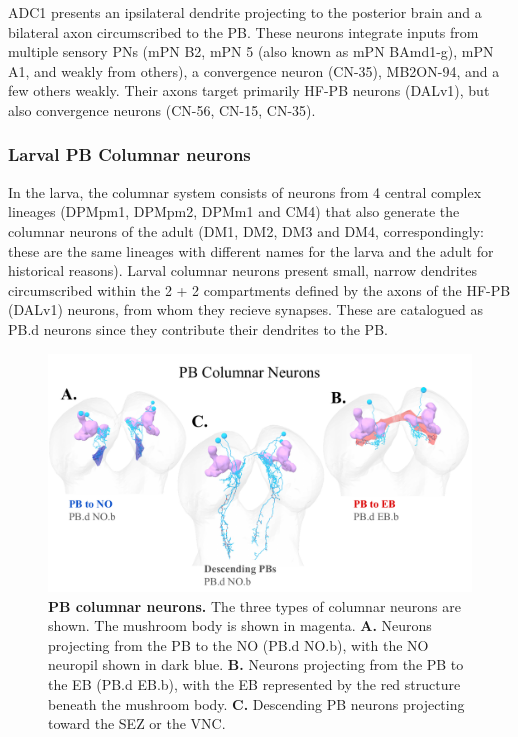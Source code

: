     ADC1 presents an ipsilateral dendrite projecting to the posterior brain and a bilateral axon circumscribed to the PB. These neurons integrate inputs from multiple sensory PNs (mPN B2, mPN 5 (also known as mPN BAmd1-g), mPN A1, and weakly from others), a convergence neuron (CN-35), MB2ON-94, and a few others weakly. Their axons target primarily HF-PB neurons (DALv1), but also convergence neurons  (CN-56, CN-15, CN-35).
 
        \subsubsection{Larval PB Columnar neurons}

    In the larva, the columnar system consists of neurons from 4 central complex lineages (DPMpm1, DPMpm2, DPMm1 and CM4) that also generate the columnar neurons of the adult (DM1, DM2, DM3 and DM4, correspondingly: these are the same lineages with different names for the larva and the adult for historical reasons).
    Larval columnar neurons present small, narrow dendrites circumscribed within the 2 + 2 compartments defined by the axons of the HF-PB (DALv1) neurons, from whom they recieve synapses. These are catalogued as PB.d neurons since they contribute their dendrites to the PB.

        \begin{figure}[H]
            \centering
            \includegraphics[width=12cm]{Figs/CX/PBcolumnar.pdf}
            \caption[PB columnar neurons]{\textbf{PB columnar neurons.} The three types of columnar neurons are shown. The mushroom body is shown in magenta. \textbf{A.} Neurons projecting from the PB to the NO (PB.d NO.b), with the NO neuropil shown in dark blue. \textbf{B.} Neurons projecting from the PB to the EB (PB.d EB.b), with the EB represented by the red structure beneath the mushroom body. \textbf{C.} Descending PB neurons projecting toward the SEZ or the VNC.}
            \label{pbcolumnar}
        \end{figure}


